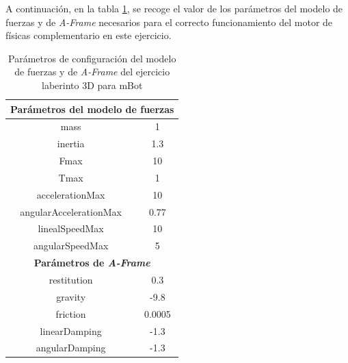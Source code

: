 \clearpage

A continuación, en la tabla \ref{tabla:param_ej2}, se recoge el valor de los parámetros del modelo de fuerzas y de  \textit{A-Frame} necesarios para el correcto funcionamiento del motor de físicas complementario en este ejercicio.

\begin{table}[h!]
\centering
\begin{tabular}{|c|c|}
\hline
\multicolumn{2}{|c|}{\textbf{Parámetros del modelo de fuerzas}}                \\ \hline
mass                                           & 1                             \\ \hline
inertia                                        & 1.3                           \\ \hline
Fmax                                           & 10                            \\ \hline
Tmax                                           & 1                             \\ \hline
accelerationMax                                & 10                            \\ \hline
angularAccelerationMax                         & 0.77                          \\ \hline
linealSpeedMax                                 & 10                            \\ \hline
angularSpeedMax                                & 5                             \\ \hline
\multicolumn{2}{|c|}{\textbf{Parámetros de \textit{A-Frame}}} \\ \hline
restitution                                    & 0.3                           \\ \hline
gravity                                        & -9.8                          \\ \hline
friction                                       &  0.0005                       \\ \hline
linearDamping                                  & -1.3                          \\ \hline
angularDamping                                 & -1.3                          \\ \hline
\end{tabular}
\caption{Parámetros de configuración del modelo de fuerzas y de \textit{A-Frame} del ejercicio laberinto 3D para mBot}
\label{tabla:param_ej2}
\end{table}

